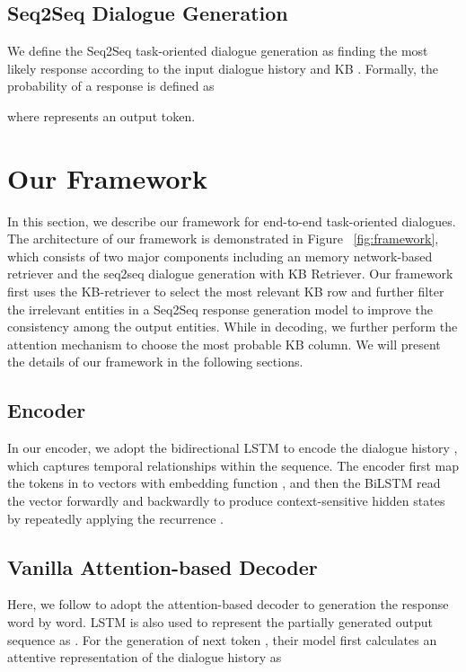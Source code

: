 \documentclass[11pt,a4paper]{article}
\begin{document}
\subsection{Seq2Seq Dialogue Generation}
We define the Seq2Seq task-oriented dialogue generation
as finding the most likely response 
according to the input dialogue history  and KB .
Formally, the probability of a response is defined as

where  represents an output token.


\section{Our Framework}
In this section, we describe our framework for end-to-end task-oriented dialogues.
The architecture of our framework is demonstrated in Figure ~\ref{fig:framework},  
which consists of two major components including an memory network-based retriever and the seq2seq dialogue generation with KB Retriever.
Our framework first uses the  KB-retriever to select the most relevant KB row and further filter the irrelevant entities
in a Seq2Seq response generation model
to improve the consistency among the output entities.
While in decoding, we further perform the attention mechanism to choose the most probable KB column.
We will present the details of our framework in the following sections.

\subsection{Encoder}
In our encoder, we adopt the bidirectional LSTM 
\cite[BiLSTM]{hochreiter1997long} to encode the dialogue history  , 
which captures temporal relationships within the sequence.
The encoder first map the tokens in  to vectors
with embedding function ,
and then the BiLSTM read the vector forwardly and backwardly to produce context-sensitive  hidden states 
by repeatedly applying the recurrence 
.

\subsection{Vanilla Attention-based Decoder}\label{sec:method:vanilla-decoder}

Here, we follow  to adopt the attention-based decoder to generation the response word by word.
LSTM is also used to represent the partially generated output sequence 
as .
For the generation of next token , their model
first calculates an attentive representation  of the dialogue history as
\end{document}
